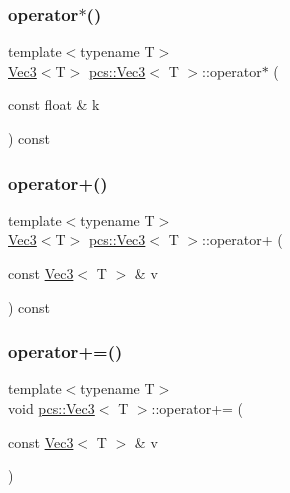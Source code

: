\mbox{\label{structpcs_1_1Vec3_a1060574173402528a31c94a0554e4d10}} 
\subsubsection{\texorpdfstring{operator$\ast$()}{operator*()}}
{\footnotesize\ttfamily template$<$typename T$>$ \\
\hyperlink{structpcs_1_1Vec3}{Vec3}$<$T$>$ \hyperlink{structpcs_1_1Vec3}{pcs\+::\+Vec3}$<$ T $>$\+::operator$\ast$ (\begin{DoxyParamCaption}\item[{const float \&}]{k }\end{DoxyParamCaption}) const\hspace{0.3cm}{\ttfamily [inline]}}

\mbox{\label{structpcs_1_1Vec3_a261591cf01248c3f9ad2524450394ac4}} 
\subsubsection{\texorpdfstring{operator+()}{operator+()}}
{\footnotesize\ttfamily template$<$typename T$>$ \\
\hyperlink{structpcs_1_1Vec3}{Vec3}$<$T$>$ \hyperlink{structpcs_1_1Vec3}{pcs\+::\+Vec3}$<$ T $>$\+::operator+ (\begin{DoxyParamCaption}\item[{const \hyperlink{structpcs_1_1Vec3}{Vec3}$<$ T $>$ \&}]{v }\end{DoxyParamCaption}) const\hspace{0.3cm}{\ttfamily [inline]}}

\mbox{\label{structpcs_1_1Vec3_ac9ea8184b784ce6324df893c304239f9}} 
\subsubsection{\texorpdfstring{operator+=()}{operator+=()}}
{\footnotesize\ttfamily template$<$typename T$>$ \\
void \hyperlink{structpcs_1_1Vec3}{pcs\+::\+Vec3}$<$ T $>$\+::operator+= (\begin{DoxyParamCaption}\item[{const \hyperlink{structpcs_1_1Vec3}{Vec3}$<$ T $>$ \&}]{v }\end{DoxyParamCaption})\hspace{0.3cm}{\ttfamily [inline]}}

